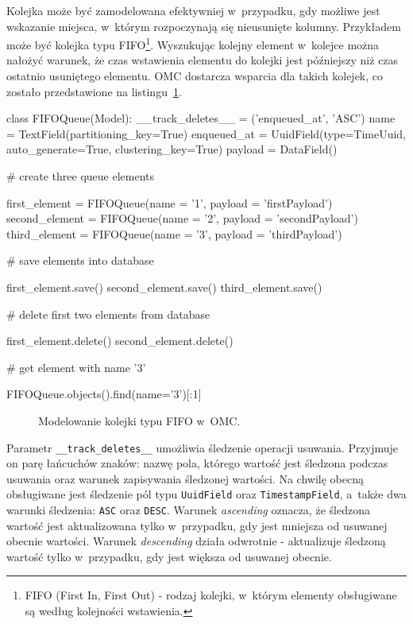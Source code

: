 Kolejka może być zamodelowana efektywniej w~przypadku, gdy możliwe jest wskazanie miejsca, w~którym rozpoczynają się nieusunięte kolumny. Przykładem może być kolejka typu FIFO\footnote{FIFO (First In, First Out) - rodzaj kolejki, w~którym elementy obsługiwane są według kolejności wstawienia.}. Wyszukując kolejny element w~kolejce można nałożyć warunek, że czas wstawienia elementu do kolejki jest późniejszy niż czas ostatnio usuniętego elementu. OMC dostarcza wsparcia dla takich kolejek, co zostało przedstawione na listingu~\ref{lst:fifo_queue_modeling}.

\begin{verbbox}
class FIFOQueue(Model):
    __track_deletes__ = ('enqueued_at', 'ASC')
    name = TextField(partitioning_key=True)
    enqueued_at = UuidField(type=TimeUuid, 
                            auto_generate=True, 
                            clustering_key=True)
    payload = DataField()

# create three queue elements

first_element = FIFOQueue(name = '1', payload = 'firstPayload')
second_element = FIFOQueue(name = '2', payload = 'secondPayload')
third_element = FIFOQueue(name = '3', payload = 'thirdPayload')

# save elements into database

first_element.save()
second_element.save()
third_element.save()

# delete first two elements from database

first_element.delete()
second_element.delete()

# get element with name '3'

FIFOQueue.objects().find(name='3')[:1]
\end{verbbox}

\begin{figure}[ht!]
	\centering
	\theverbbox
	\caption{Modelowanie kolejki typu FIFO w~OMC.}
	\label{lst:fifo_queue_modeling}
\end{figure}

Parametr \verb+__track_deletes__+ umożliwia śledzenie operacji usuwania. Przyjmuje on parę łańcuchów znaków: nazwę pola, którego wartość jest śledzona podczas usuwania oraz warunek zapisywania śledzonej wartości. Na chwilę obecną obsługiwane jest śledzenie pól typu \verb+UuidField+ oraz \verb+TimestampField+, a~także dwa warunki śledzenia: \verb+ASC+ oraz \verb+DESC+. Warunek \emph{ascending} oznacza, że śledzona wartość jest aktualizowana tylko w~przypadku, gdy jest mniejsza od usuwanej obecnie wartości. Warunek \emph{descending} działa odwrotnie - aktualizuje śledzoną wartość tylko w~przypadku, gdy jest większa od usuwanej obecnie.

